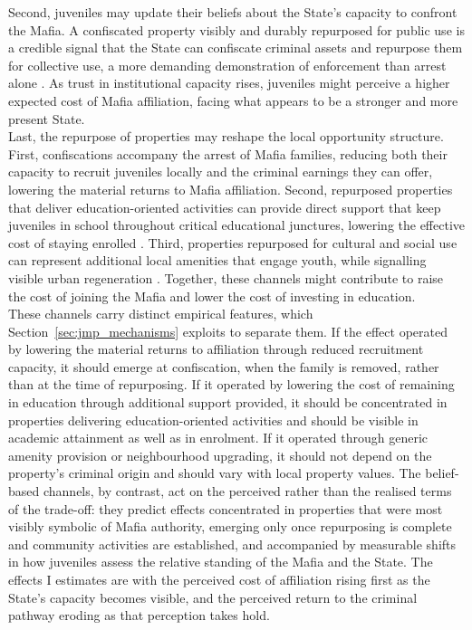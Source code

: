 \documentclass[12pt]{article}
\theoremstyle{plain}
\theoremstyle{plain}
\theoremstyle{plain}
\theoremstyle{definition}
\theoremstyle{plain}
\theoremstyle{definition}
\theoremstyle{plain}
\theoremstyle{remark}
\theoremstyle{definition}
\theoremstyle{definition}
\theoremstyle{plain}
\begin{document}
Second, juveniles may update their beliefs about the State's capacity to confront the Mafia. A confiscated property visibly and durably repurposed for public use is a credible signal that the State can confiscate criminal assets and repurpose them for collective use, a more demanding demonstration of enforcement than arrest alone \citep{chiodo_community_2021, mosca_social_2017, heller_thinking_2017}. As trust in institutional capacity rises, juveniles might perceive a higher expected cost of Mafia affiliation, facing what appears to be a stronger and more present State.
 \\
Last, the repurpose of properties may reshape the local opportunity structure. First, confiscations accompany the arrest of Mafia families, reducing both their capacity to recruit juveniles locally and the criminal earnings they can offer, lowering the material returns to Mafia affiliation. Second, repurposed properties that deliver education-oriented activities can provide direct support that keep juveniles in school throughout critical educational junctures, lowering the effective cost of staying enrolled \citep{heller_summer_2014, garcia_early_2019}. Third, properties repurposed for cultural and social use can represent additional local amenities that engage youth, while signalling visible urban regeneration \citep{datcher_effects_1982, ludwig_long-term_2013}. Together, these channels might contribute to raise the cost of joining the Mafia and lower the cost of investing in education. \\
These channels carry distinct empirical features, which Section~\ref{sec:jmp_mechanisms} exploits to separate them. If the effect operated by lowering the material returns to affiliation through reduced recruitment capacity, it should emerge at confiscation, when the family is removed, rather than at the time of repurposing. If it operated by lowering the cost of remaining in education through additional support provided, it should be concentrated in properties delivering education-oriented activities and should be visible in academic attainment as well as in enrolment. If it operated through generic amenity provision or neighbourhood upgrading, it should not depend on the property's criminal origin and should vary with local property values. The belief-based channels, by contrast, act on the perceived rather than the realised terms of the trade-off: they predict effects concentrated in properties that were most visibly symbolic of Mafia authority, emerging only once repurposing is complete and community activities are established, and accompanied by measurable shifts in how juveniles assess the relative standing of the Mafia and the State. The effects I estimates are with the perceived cost of affiliation rising first as the State's capacity becomes visible, and the perceived return to the criminal pathway eroding as that perception takes hold.
\end{document}
